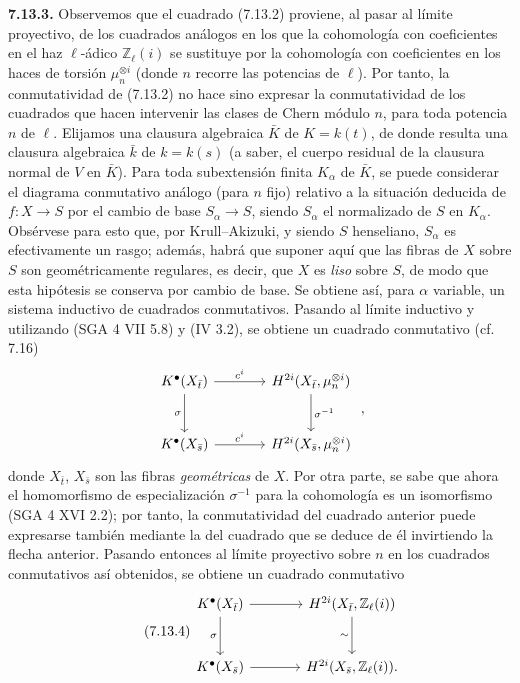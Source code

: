 \textbf{7.13.3.} Observemos que el cuadrado (7.13.2) proviene, al pasar al límite proyectivo, de los cuadrados análogos en los que la cohomología con coeficientes en el haz \(\ell\)-ádico \(\mathbb Z_\ell(i)\) se sustituye por la cohomología con coeficientes en los haces de torsión \(\mu_n^{\otimes i}\) (donde \(n\) recorre las potencias de \(\ell\)). Por tanto, la conmutatividad de (7.13.2) no hace sino expresar la conmutatividad de los cuadrados que hacen intervenir las clases de Chern módulo \(n\), para toda potencia \(n\) de \(\ell\). Elijamos una clausura algebraica \(\bar K\) de \(K=k(t)\), de donde resulta una clausura algebraica \(\bar k\) de \(k=k(s)\) (a saber, el cuerpo residual de la clausura normal de \(V\) en \(\bar K\)). Para toda subextensión finita \(K_\alpha\) de \(\bar K\), se puede considerar el diagrama conmutativo análogo (para \(n\) fijo) relativo a la situación deducida de \(f:X\to S\) por el cambio de base \(S_\alpha\to S\), siendo \(S_\alpha\) el normalizado de \(S\) en \(K_\alpha\). Obsérvese para esto que, por Krull--Akizuki, y siendo \(S\) henseliano, \(S_\alpha\) es efectivamente un rasgo; además, habrá que suponer aquí que las fibras de \(X\) sobre \(S\) son geométricamente regulares, es decir, que \(X\) es \emph{liso} sobre \(S\), de modo que esta hipótesis se conserva por cambio de base. Se obtiene así, para \(\alpha\) variable, un sistema inductivo de cuadrados conmutativos. Pasando al límite inductivo y utilizando (SGA 4 VII 5.8) y (IV 3.2), se obtiene un cuadrado conmutativo (cf. 7.16)
\[
\begin{tikzcd}[column sep=large,row sep=large]
K^\bullet(X_{\bar t}) \arrow[r,"c^i"] \arrow[d,"\sigma"'] &
H^{2i}(X_{\bar t},\mu_n^{\otimes i}) \arrow[d,"\sigma^{-1}"]\\
K^\bullet(X_{\bar s}) \arrow[r,"c^i"] &
H^{2i}(X_{\bar s},\mu_n^{\otimes i})
\end{tikzcd}
\;,
\]
donde \(X_{\bar t}\), \(X_{\bar s}\) son las fibras \emph{geométricas} de \(X\). Por otra parte, se sabe que ahora el homomorfismo de especialización \(\sigma^{-1}\) para la cohomología es un isomorfismo (SGA 4 XVI 2.2); por tanto, la conmutatividad del cuadrado anterior puede expresarse también mediante la del cuadrado que se deduce de él invirtiendo la flecha anterior. Pasando entonces al límite proyectivo sobre \(n\) en los cuadrados conmutativos así obtenidos, se obtiene un cuadrado conmutativo
\begin{equation}\tag{7.13.4}
\begin{tikzcd}[column sep=large,row sep=large]
K^\bullet(X_{\bar t}) \arrow[r] \arrow[d,"\sigma"'] &
H^{2i}(X_{\bar t},\mathbb Z_\ell(i)) \arrow[d,"\sim"']\\
K^\bullet(X_{\bar s}) \arrow[r] &
H^{2i}(X_{\bar s},\mathbb Z_\ell(i)).
\end{tikzcd}
\end{equation}

